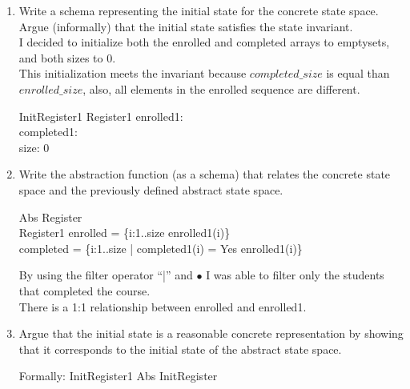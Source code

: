\documentclass{article}
\begin{document}
\begin{enumerate}
  \begin{schema}{Register1}
    enrolled1:   \to Student\\
    completed1:  \to HasCompletedTheCourse \\
    size:  \\
  \where
  \forall i,j: 1..size \bullet i \neq j \implies enrolled1(i) \neq enrolled1(j)) 
  \end{schema}
  \color{black}
\item Write a schema representing the initial state for the concrete state space. Argue (informally) that the initial state satisfies the state invariant. \\
  \color{blue}
  I decided to initialize both the enrolled and completed arrays to emptysets, and both sizes to 0. \\
  This initialization meets the invariant because $completed\_size$ is equal than $enrolled\_size$, also, all elements in the enrolled sequence are different. \\
  \begin{schema}{InitRegister1}
    Register1
  \where
    enrolled1: \emptyset \\
    completed1: \emptyset \\
    size: 0 \\
  \end{schema}
  \color{black}  
\item Write the abstraction function (as a schema) that
relates the concrete state space and the previously defined abstract state
space.
\color{blue}
  \begin{schema}{Abs}
    Register \\
    Register1
  \where
    enrolled = \{i:1..size \bullet enrolled1(i)\} \\
    completed = \{i:1..size | completed1(i) = Yes  \bullet enrolled1(i)\}
  \end{schema}
  \color{black}  
  By using the filter operator ``|'' and $\bullet$ I was able to filter only the students that completed the course.\\
  There is a 1:1 relationship between enrolled and enrolled1. \\
\item Argue that the initial state is a reasonable concrete
representation by showing that it corresponds to the initial state
of the abstract state space.\\
\color{blue}
\begin{zed}
Formally: InitRegister1 \land Abs \vdash InitRegister 
\end{zed}


\end{enumerate}
\end{document}
